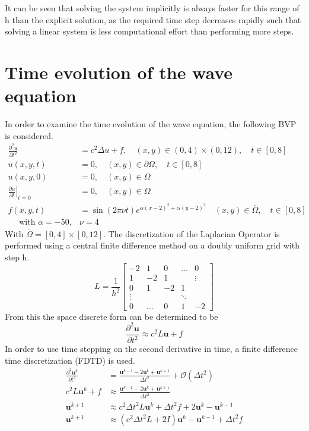 \documentclass{article}
\begin{document}
It can be seen that solving the system implicitly is always faster for this range of h than the explicit solution, as the required time step decreases rapidly such that solving a linear system is less computational effort than performing more steps.

\section{Time evolution of the wave equation}
In order to examine the time evolution of the wave equation, the following BVP is considered.
\begin{equation}
\begin{aligned} \frac{\partial^{2} u}{\partial t^{2}} &=c^{2} \Delta u+f, \quad(x, y) \in(0,4) \times(0,12), \quad t \in[0,8] \\ u(x, y, t) &=0, \quad(x, y) \in \partial \Omega, \quad t \in[0,8] \\ u(x, y, 0) &=0, \quad(x, y) \in \Omega \\\left.\frac{\partial u}{\partial t}\right|_{t=0} &=0, \quad(x, y) \in \Omega \\ f(x, y, t) &=\sin (2 \pi \nu t) e^{\alpha(x-2)^{2}+\alpha(y-2)^{2}} \quad(x, y) \in \overline{\Omega}, \quad t \in[0,8] \\ \quad \text { with } \alpha=-50, & \nu=4 \end{aligned}
\end{equation}
With $\overline{\Omega} = \left[0,4\right]\times \left[0,12\right]$. 
The discretization of the Laplacian Operator is performed using a central finite difference method on a doubly uniform grid with step h.
\begin{equation}
L=\frac{1}{h^2}
\begin{bmatrix}
-2&1&0&\dots&0\\
1&-2&1& &\vdots\\
0&1&-2&1&\\
\vdots&&&\ddots&\\
0&\dots&0&1&-2
\end{bmatrix}
\end{equation}
From this the space discrete form can be determined to be
\begin{equation}
\frac{\partial^2 \mathbf{u}}{\partial t^2} \approx c^2 L \mathbf{u} + f
\end{equation}
In order to use time stepping on the second derivative in time, a finite difference time discretization (FDTD) is used.
\begin{align}
\frac{\partial^2 \mathbf{u}^k}{\partial t^2} &= \frac{\mathbf{u}^{k-1}-2\mathbf{u}^{k}+\mathbf{u}^{k+1}}{\Delta t ^2}+\mathcal{O}(\Delta t^2)\\
 c^2 L \mathbf{u}^k +f &\approx \frac{\mathbf{u}^{k-1}-2\mathbf{u}^{k}+\mathbf{u}^{k+1}}{\Delta t ^2}\\
\mathbf{u}^{k+1} &\approx c^2 \Delta t ^2 L \mathbf{u}^k +\Delta t ^2 f + 2\mathbf{u}^{k} - \mathbf{u}^{k-1}\\
\mathbf{u}^{k+1} &\approx (c^2 \Delta t ^2 L+ 2I)\mathbf{u}^{k} - \mathbf{u}^{k-1} +\Delta t ^2 f
\end{align}
\end{document}
